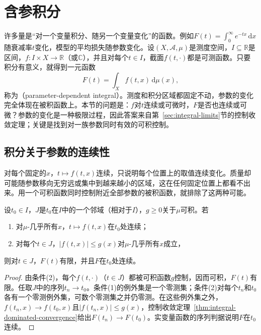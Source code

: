 \section{含参积分}
\label{sec:integral-parametric}

许多量是“对一个变量积分、随另一个变量变化”的函数。例如$F(t)=\int_0^\infty e^{-tx}\,\mathrm dx$随衰减率$t$变化，模型的平均损失随参数变化。设$(X,\mathcal A,\mu)$是测度空间，$I\subseteq\mathbb R$是区间，$f:I\times X\to\mathbb R$（或$\mathbb C$），并且对每个$t\in I$，截面$f(t,\cdot)$都是可测函数。只要积分有意义，就得到一元函数
\[
 F(t)=\int_Xf(t,x)\,\mathrm d\mu(x),
\]
称为（parameter-dependent integral）。测度和积分区域都固定不动，参数的变化完全体现在被积函数上。本节的问题是：$f$对$t$连续或可微时，$F$是否也连续或可微？参数的变化是一种极限过程，因此答案来自第~\ref{sec:integral-limits}节的控制收敛定理；关键是找到对一族参数同时有效的可积控制。

\subsection{积分关于参数的连续性}
\label{sec:integral-parametric-continuity}

对每个固定的$x$，$t\mapsto f(t,x)$连续，只说明每个位置上的取值连续变化。质量却可能随参数移向无穷远或集中到越来越小的区域，这在任何固定位置上都看不出来。用一个可积函数同时控制附近全部参数的被积函数，就排除了这两种可能。

\begin{theorem}[含参积分的连续性]
\label{thm:integral-parametric-continuity}
设$t_0\in I$，$J$是$t_0$在$I$中的一个邻域（相对于$I$），$g\ge0$关于$\mu$可积。若
\begin{enumerate}
 \item 对$\mu$-几乎所有$x$，$t\mapsto f(t,x)$在$t_0$处连续；
 \item 对每个$t\in J$，$|f(t,x)|\le g(x)$对$\mu$-几乎所有$x$成立，
\end{enumerate}
则对$t\in J$，$F(t)$有限，并且$F$在$t_0$处连续。
\end{theorem}

\begin{proof}
由条件(2)，每个$f(t,\cdot)$（$t\in J$）都被可积函数$g$控制，因而可积，$F(t)$有限。任取$J$中的序列$t_n\to t_0$。条件(1)的例外集是一个零测集；条件(2)对每个$t_n$和$t_0$各有一个零测例外集，可数个零测集之并仍零测。在这些例外集之外，$f(t_n,x)\to f(t_0,x)$且$|f(t_n,x)|\le g(x)$，控制收敛定理~\ref{thm:integral-dominated-convergence}给出$F(t_n)\to F(t_0)$。实变量函数的序列判据说明$F$在$t_0$连续。
\end{proof}

